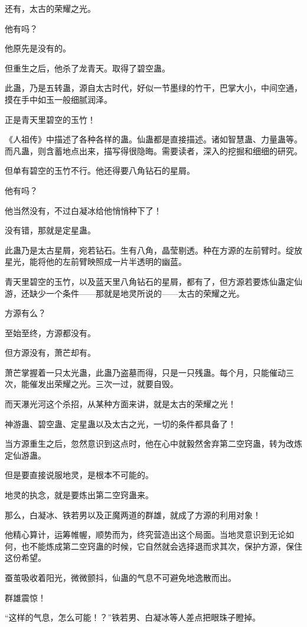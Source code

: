 \begin{this_body}
还有，太古的荣耀之光。

他有吗？

他原先是没有的。

但重生之后，他杀了龙青天。取得了碧空蛊。

此蛊，乃是五转蛊，源自太古时代，好似一节墨绿的竹干，巴掌大小，中间空通，摸在手中如玉一般细腻润泽。

正是青天里碧空的玉竹！

《人祖传》中描述了各种各样的蛊。仙蛊都是直接描述。诸如智慧蛊、力量蛊等。而凡蛊，则含蓄地点出来，描写得很隐晦。需要读者，深入的挖掘和细细的研究。

但单有碧空的玉竹不行。他还得要八角钻石的星屑。

他有吗？

他当然没有，不过白凝冰给他悄悄种下了！

没有错，那就是定星蛊。

此蛊乃是太古星屑，宛若钻石。生有八角，晶莹剔透。种在方源的左前臂时。绽放星光，能将他的左前臂映照成一片半透明的幽蓝。

青天里碧空的玉竹，以及蓝天里八角钻石的星屑，都有了，但方源若要炼仙蛊定仙游，还缺少一个条件——那就是地灵所说的——太古的荣耀之光。

方源有么？

至始至终，方源都没有。

但方源没有，萧芒却有。

萧芒掌握着一只太光蛊，此蛊乃盗墓而得，只是一只残蛊。每个月，只能催动三次，能催发出荣耀之光。三次一过，就要自毁。

而天瀑光河这个杀招，从某种方面来讲，就是太古的荣耀之光！

神游蛊、碧空蛊、定星蛊以及太古之光，一切的条件都具备了！

当方源重生之后，忽然意识到这点时，他在心中就毅然舍弃第二空窍蛊，转为改炼定仙游蛊。

但是要直接说服地灵，是根本不可能的。

地灵的执念，就是要炼出第二空窍蛊来。

那么，白凝冰、铁若男以及正魔两道的群雄，就成了方源的利用对象！

他精心算计，运筹帷幄，顺势而为，终究营造出这个局面。当地灵意识到无论如何，也不能炼成第二空窍蛊的时候，它自然就会选择退而求其次，保护方源，保住这份希望。

蚕茧吸收着阳光，微微颤抖，仙蛊的气息不可避免地逸散而出。

群雄震惊！

“这样的气息，怎么可能！？”铁若男、白凝冰等人差点把眼珠子瞪掉。


\end{this_body}
